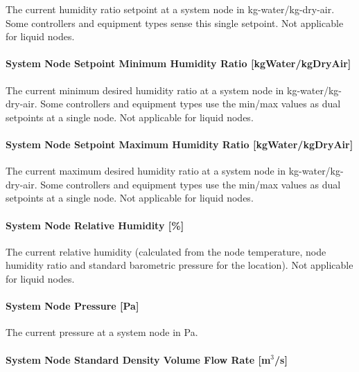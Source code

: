 The current humidity ratio setpoint at a system node in kg-water/kg-dry-air. Some controllers and equipment types sense this single setpoint. Not applicable for liquid nodes.

\paragraph{System Node Setpoint Minimum Humidity Ratio {[}kgWater/kgDryAir{]}}\label{system-node-setpoint-minimum-humidity-ratio-kgwaterkgdryair}

The current minimum desired humidity ratio at a system node in kg-water/kg-dry-air. Some controllers and equipment types use the min/max values as dual setpoints at a single node. Not applicable for liquid nodes.

\paragraph{System Node Setpoint Maximum Humidity Ratio {[}kgWater/kgDryAir{]}}\label{system-node-setpoint-maximum-humidity-ratio-kgwaterkgdryair}

The current maximum desired humidity ratio at a system node in kg-water/kg-dry-air. Some controllers and equipment types use the min/max values as dual setpoints at a single node. Not applicable for liquid nodes.

\paragraph{System Node Relative Humidity {[}\%{]}}\label{system-node-relative-humidity}

The current relative humidity (calculated from the node temperature, node humidity ratio and standard barometric pressure for the location). Not applicable for liquid nodes.

\paragraph{System Node Pressure {[}Pa{]}}\label{system-node-pressure-pa}

The current pressure at a system node in Pa.

\paragraph{System Node Standard Density Volume Flow Rate {[}m\(^{3}\)/s{]}}\label{system-node-standard-density-volume-flow-rate-m3s}

